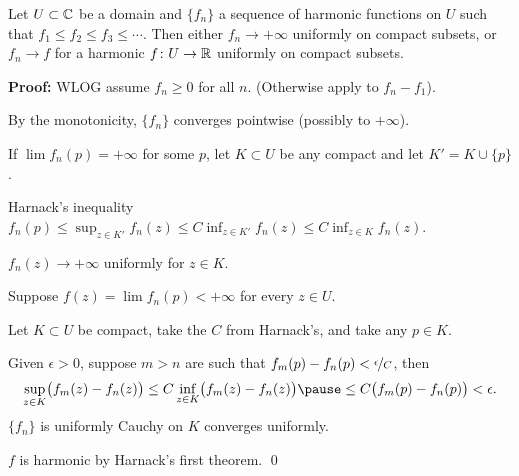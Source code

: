 \documentclass[10pt,aspectratio=169]{beamer}
\begin{document}
\begin{frame}

\begin{theorem}
Let $U \subset {\mathbb{C}}$ be a domain and $\{ f_n \}$ a sequence of
harmonic functions on $U$ such that $f_1 \leq f_2 \leq f_3 \leq \cdots$.
Then either $f_n \to +\infty$ uniformly on compact subsets, or
$f_n \to f$ for a harmonic $f \colon U \to {\mathbb{R}}$ uniformly on compact subsets.
\end{theorem}

\pause

\textbf{Proof:}
WLOG assume $f_n \geq 0$ for all $n$.  (Otherwise apply to 
$f_n-f_1$).

\pause

By the monotonicity, $\{f_n\}$ converges pointwise (possibly to $+\infty$).

\pause

If $\lim f_n(p) = +\infty$ for some $p$,
\pause
let $K \subset U$ be any compact and let $K' = K \cup \{ p \}$.

\medskip
\pause
Harnack's inequality \wthus
$\displaystyle f_n(p) \leq \sup_{z \in K'} f_n(z) \leq C \inf_{z\in K'} f_n(z) \leq C \inf_{z\in K} f_n(z)$.

\medskip
\pause
\thus \quad
$f_n(z) \to +\infty$ uniformly for $z \in K$.

\medskip
\pause

Suppose $f(z) = \lim f_n(p) < +\infty$ for every $z \in U$.

\pause
Let $K \subset U$ be compact, take the $C$ from Harnack's, and take any $p \in K$.

\pause

Given $\epsilon > 0$, suppose $m > n$ are 
such that $f_m(p)-f_n(p) < \nicefrac{\epsilon}{C}$,
\pause
then
\[
\sup_{z \in K} \bigl( f_m(z)- f_n(z) \bigr)
\leq
C \inf_{z\in K} \bigl( f_m(z)-f_n(z) \bigr)
\pause
\leq
C \bigl( f_m(p)-f_n(p) \bigr)
< \epsilon .
\]
\pause
\thus \quad
$\{ f_n \}$ is uniformly Cauchy on $K$
\pause
\wthus
converges uniformly.
\pause

$f$ is harmonic by Harnack's first theorem.
\qed
\end{frame}
\end{document}
